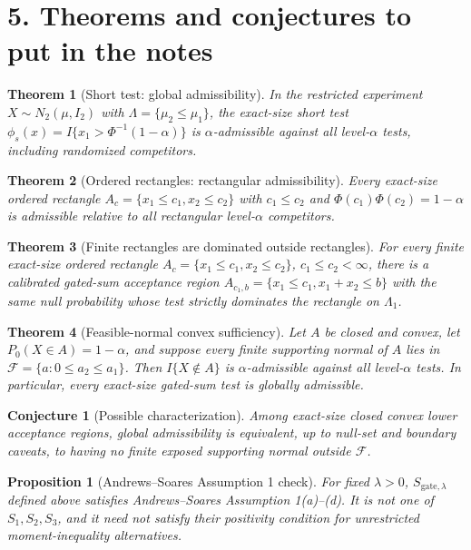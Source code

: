 \documentclass[10pt]{article}
\newtheorem{theorem}{Theorem}
\newtheorem{proposition}{Proposition}
\newtheorem{conjecture}{Conjecture}
\begin{document}
\section*{5. Theorems and conjectures to put in the notes}

\begin{theorem}[Short test: global admissibility]
In the restricted experiment $X\sim N_2(\mu,I_2)$ with $\Lambda=\{\mu_2\le\mu_1\}$, the exact-size short test $\phi_s(x)=I\{x_1>\Phi^{-1}(1-\alpha)\}$ is $\alpha$-admissible against all level-$\alpha$ tests, including randomized competitors.
\end{theorem}

\begin{theorem}[Ordered rectangles: rectangular admissibility]
Every exact-size ordered rectangle $A_c=\{x_1\le c_1,x_2\le c_2\}$ with $c_1\le c_2$ and $\Phi(c_1)\Phi(c_2)=1-\alpha$ is admissible relative to all rectangular level-$\alpha$ competitors.
\end{theorem}

\begin{theorem}[Finite rectangles are dominated outside rectangles]
For every finite exact-size ordered rectangle $A_c=\{x_1\le c_1,x_2\le c_2\}$, $c_1\le c_2<\infty$, there is a calibrated gated-sum acceptance region $A_{c_1,b}=\{x_1\le c_1,x_1+x_2\le b\}$ with the same null probability whose test strictly dominates the rectangle on $\Lambda_1$.
\end{theorem}

\begin{theorem}[Feasible-normal convex sufficiency]
Let $A$ be closed and convex, let $P_0(X\in A)=1-\alpha$, and suppose every finite supporting normal of $A$ lies in $\mathcal F=\{a:0\le a_2\le a_1\}$.  Then $I\{X\notin A\}$ is $\alpha$-admissible against all level-$\alpha$ tests.  In particular, every exact-size gated-sum test is globally admissible.
\end{theorem}

\begin{conjecture}[Possible characterization]
Among exact-size closed convex lower acceptance regions, global admissibility is equivalent, up to null-set and boundary caveats, to having no finite exposed supporting normal outside $\mathcal F$.
\end{conjecture}

\begin{proposition}[Andrews--Soares Assumption 1 check]
For fixed $\lambda>0$, $S_{\mathrm{gate},\lambda}$ defined above satisfies Andrews--Soares Assumption 1(a)--(d).  It is not one of $S_1,S_2,S_3$, and it need not satisfy their positivity condition for unrestricted moment-inequality alternatives.
\end{proposition}
\end{document}
